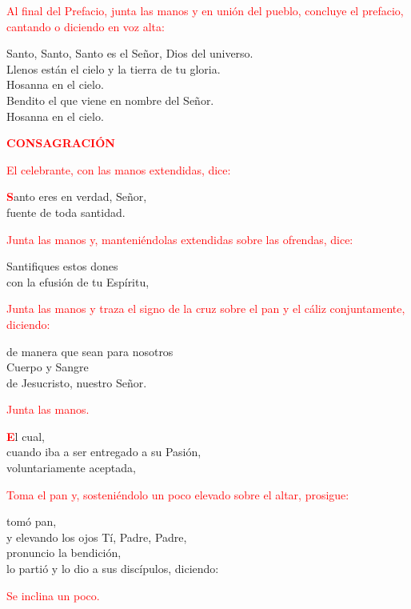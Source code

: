 \documentclass[12pt, letterpaper]{report}
\begin{document}
\large{\textcolor{red}{Al final del Prefacio, junta las manos y en uni\'on del pueblo, concluye el prefacio, cantando o diciendo en voz alta:}}

\noindent
\Large {Santo, Santo, Santo es el Se\~nor, Dios del universo.\\
Llenos est\'an el cielo y la tierra de tu gloria.\\
Hosanna en el cielo.\\
Bendito el que viene en nombre del Se\~nor.\\
Hosanna en el cielo.}

\Large {\bfseries \textcolor{red}{CONSAGRACI\'ON}} 

\large{\textcolor{red}{El celebrante, con las manos extendidas, dice:}}

\lettrine[lines=2]{\bfseries \textcolor{red}{S}}{}\Large anto eres en verdad, Se\~nor,\\
fuente de toda santidad.

\large{\textcolor{red}{Junta las manos y, manteni\'endolas extendidas sobre las ofrendas, dice:}}

\noindent
\Large Santifiques estos dones\\
con la efusi\'on de tu Esp\'iritu,

\large{\textcolor{red}{Junta las manos y traza el signo de la cruz sobre el pan y el c\'aliz conjuntamente, diciendo:}}

\noindent
\Large de manera que sean para nosotros\\
Cuerpo y \Huge{\textcolor{red}{}} \Large Sangre\\
de Jesucristo, nuestro Se\~nor.

\large{\textcolor{red}{Junta las manos.}}

\lettrine[lines=2]{\bfseries \textcolor{red}{E}}{}\Large l cual,\\
cuando iba a ser entregado a su Pasi\'on,\\
voluntariamente aceptada,

\large{\textcolor{red}{Toma el pan y, sosteni\'endolo un poco elevado sobre el altar, prosigue:}}

\noindent
\Large tom\'o pan,\\ 
y elevando los ojos T\'i, Padre, Padre,\\
pronuncio la bendici\'on, \\
lo parti\'o y lo dio a sus disc\'ipulos, diciendo:

\large{\textcolor{red}{Se inclina un poco.}} 
\end{document}
